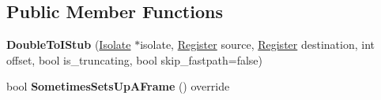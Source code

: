 \subsection*{Public Member Functions}
\begin{DoxyCompactItemize}
\item 
{\bfseries Double\+To\+I\+Stub} (\hyperlink{classv8_1_1internal_1_1_isolate}{Isolate} $\ast$isolate, \hyperlink{structv8_1_1internal_1_1_register}{Register} source, \hyperlink{structv8_1_1internal_1_1_register}{Register} destination, int offset, bool is\+\_\+truncating, bool skip\+\_\+fastpath=false)\hypertarget{classv8_1_1internal_1_1_double_to_i_stub_aea39032084ac79a9ee7f48ea34a993d5}{}\label{classv8_1_1internal_1_1_double_to_i_stub_aea39032084ac79a9ee7f48ea34a993d5}

\item 
bool {\bfseries Sometimes\+Sets\+Up\+A\+Frame} () override\hypertarget{classv8_1_1internal_1_1_double_to_i_stub_ac2681bf4d110a11dc5bec49d66a80303}{}\label{classv8_1_1internal_1_1_double_to_i_stub_ac2681bf4d110a11dc5bec49d66a80303}

\end{DoxyCompactItemize}
